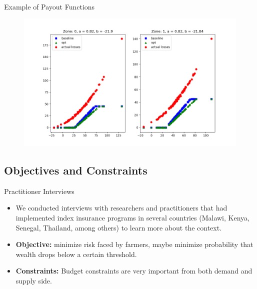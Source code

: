 \documentclass{beamer}
\begin{document}
\begin{frame}{Example of Payout Functions}
    \begin{figure}
        \includegraphics[width=\textwidth]{../../output/figures/Bootstrap/pos_corr_nonlinear_premium.png}
    \end{figure}
\end{frame}

\subsection{Objectives and Constraints}
\begin{frame}{Practitioner Interviews}
\begin{itemize}
   \setlength\itemsep{2em}
    \item We conducted interviews with researchers and practitioners that had implemented index insurance programs in several countries (Malawi, Kenya, Senegal, Thailand, among others) to learn more about the context. 
    \item \textbf{Objective:} minimize risk faced by farmers, maybe minimize probability that wealth drops below a certain threshold.
    \item \textbf{Constraints:} Budget constraints are very important from both demand and supply side.
\end{itemize}    
\end{frame}
\end{document}
